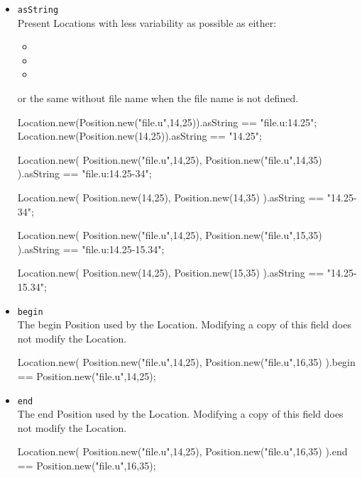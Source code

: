 \begin{itemize}

\item \lstinline|asString|\\
  Present Locations with less variability as possible as either:
  \begin{itemize}
  \item {}
  \item {}
  \item {}
  \end{itemize}
  or the same without file name when the file name is not defined.
\begin{urbiassert}[firstnumber=last]
Location.new(Position.new("file.u",14,25)).asString == "file.u:14.25";
Location.new(Position.new(14,25)).asString == "14.25";

Location.new(
  Position.new("file.u",14,25),
  Position.new("file.u",14,35)
).asString == "file.u:14.25-34";

Location.new(
  Position.new(14,25),
  Position.new(14,35)
).asString == "14.25-34";

Location.new(
  Position.new("file.u",14,25),
  Position.new("file.u",15,35)
).asString == "file.u:14.25-15.34";

Location.new(
  Position.new(14,25),
  Position.new(15,35)
).asString == "14.25-15.34";
\end{urbiassert}

\item \lstinline|begin|\\
  The begin Position used by the Location.  Modifying a copy of this field
  does not modify the Location.
\begin{urbiassert}[firstnumber=last]
Location.new(
  Position.new("file.u",14,25),
  Position.new("file.u",16,35)
).begin == Position.new("file.u",14,25);
\end{urbiassert}

\item \lstinline|end|\\
  The end Position used by the Location.  Modifying a copy of this field
  does not modify the Location.
\begin{urbiassert}[firstnumber=last]
Location.new(
  Position.new("file.u",14,25),
  Position.new("file.u",16,35)
).end == Position.new("file.u",16,35);
\end{urbiassert}


\end{itemize}

